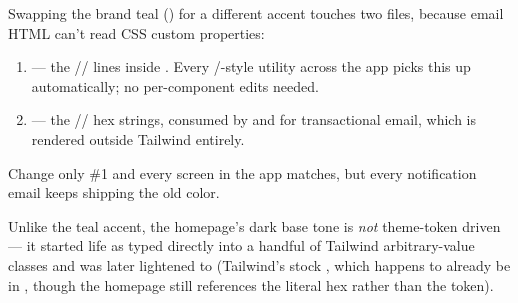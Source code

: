 \begin{olkhowto}
Swapping the brand teal () for a different accent touches two files, because email HTML can't read CSS custom properties:
\begin{enumerate}
  \item {} — the // lines inside . Every /-style utility across the app picks this up automatically; no per-component edits needed.
  \item {} — the // hex strings, consumed by  and  for transactional email, which is rendered outside Tailwind entirely.
\end{enumerate}
Change only \#1 and every screen in the app matches, but every notification email keeps shipping the old color.
\end{olkhowto}

Unlike the teal accent, the homepage's dark base tone is \emph{not} theme-token driven — it started life as  typed directly into a handful of Tailwind arbitrary-value classes and was later lightened to  (Tailwind's stock , which happens to already be  in , though the homepage still references the literal hex rather than the token).

